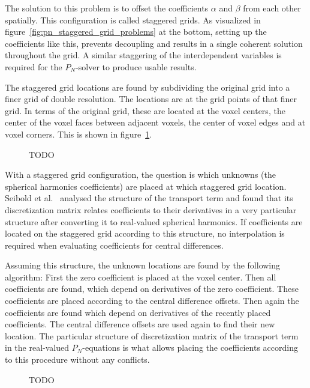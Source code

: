The solution to this problem is to offset the coefficients $\alpha$ and $\beta$ from each other spatially. This configuration is called staggered grids. As visualized in figure~\ref{fig:pn_staggered_grid_problems} at the bottom, setting up the coefficients like this, prevents decoupling and results in a single coherent solution throughout the grid. A similar staggering of the interdependent variables is required for the $P_N$-solver to produce usable results.

The staggered grid locations are found by subdividing the original grid into a finer grid of double resolution. The locations are at the grid points of that finer grid. In terms of the original grid, these are located at the voxel centers, the center of the voxel faces between adjacent voxels, the center of voxel edges and at voxel corners. This is shown in figure~\ref{fig:staggered_grid}.
\begin{figure}[h]
\centering
{}
\caption{TODO}
\label{fig:staggered_grid}
\end{figure}

With a staggered grid configuration, the question is which unknowns (the spherical harmonics coefficients) are placed at which staggered grid location. Seibold et al.~\cite{Seibold14} analysed the structure of the transport term and found that its discretization matrix relates coefficients to their derivatives in a very particular structure after converting it to real-valued spherical harmonics. If coefficients are located on the staggered grid according to this structure, no interpolation is required when evaluating coefficients for central differences.

Assuming this structure, the unknown locations are found by the following algorithm: First the zero coefficient is placed at the voxel center. Then all coefficients are found, which depend on derivatives of the zero coefficient. These coefficients are placed according to the central difference offsets. Then again the coefficients are found which depend on derivatives of the recently placed coefficients. The central difference offsets are used again to find their new location. The particular structure of discretization matrix of the transport term in the real-valued $P_N$-equations is what allows placing the coefficients according to this procedure without any conflicts. 
\begin{figure}[h]
\centering
{}
\caption{TODO}
\label{fig:staggered_grid_placement}
\end{figure}

